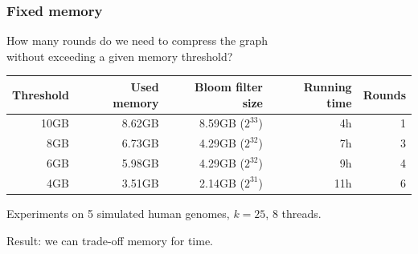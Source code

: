 
\begin{frame}
	\frametitle{Fixed memory}
	\centering
	
	How many rounds do we need to compress the graph\\ without exceeding a given memory threshold?
	
	\bigskip
	
	\begin{tabular}{ | r | r | r | r | r | }
  \hline
  Threshold  & Used memory & Bloom filter size & Running time & Rounds \\ \hline
        10GB &      8.62GB &       8.59GB ($2^{33}$) &           4h &      1 \\
         8GB &      6.73GB &       4.29GB ($2^{32}$) &           7h &      3 \\
         6GB &      5.98GB &       4.29GB ($2^{32}$) &           9h &      4 \\
         4GB &      3.51GB &       2.14GB ($2^{31}$) &          11h &      6 \\
  \hline
  \end{tabular}
  
  \medskip
  
  Experiments on 5 simulated human genomes, $k = 25$, 8 threads.
  
  \medskip
  
  Result: we can trade-off memory for time.
  

\end{frame}


